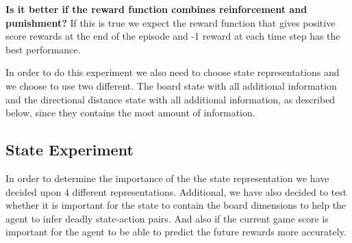 \documentclass[report.tex]{subfiles}
\begin{document}
    \textbf{Is it better if the reward function combines reinforcement and punishment?} If this is true we expect the reward function that gives positive score rewards at the end of the episode and -1 reward at each time step has the best performance.


    In order to do this experiment we also need to choose state representations and we choose to use two different. The board state with all additional information and the directional distance state with all additional information, as described below, since they contains the most amount of information.

    \subsection*{State Experiment}

    In order to determine the importance of the the state representation we have decided upon 4 different representations. Additional, we have also decided to test whether it is important for the state to contain the board dimensions to help the agent to infer deadly state-action pairs. And also if the current game score is important for the agent to be able to predict the future rewards more accurately.
\end{document}
